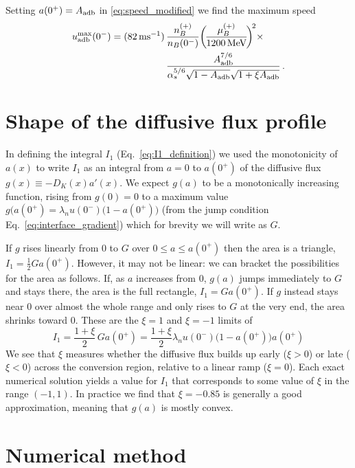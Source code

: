 \documentclass[10pt,superscriptaddress,
amsmath,aps,prc,twocolumn,nofootinbib,floatfix]{revtex4-1}
\newcommand{\mga}[1]{{\color[rgb]{0.6,0,0}#1}}
\newcommand{\al}{\alpha}
\newcommand{\m}{\text{m}}
\newcommand{\s}{\text{s}}
\newcommand{\MeV}{\text{MeV}}
\newcommand{\Bratio}{\lambda_n}
\newcommand{\azp}{\ensuremath{a(0^+)}}
\begin{document}
Setting $\azp=A_{\rm adb}$ in \eqref{eq:speed_modified} we find the maximum speed
\begin{align}
u^{\max}_{\rm adb} (0^-) = (82\,\m\s^{-1})\,
&\dfrac{n_B^{(+)}}{n_B(0^-)}
\biggl(\!\dfrac{\mu_B^{(+)}}{1200\,\MeV}\!\biggr)^{\!2}
\times \notag\\
& \dfrac{ A_{\rm adb}^{7/6}}{\al_s^{5/6} \sqrt{1-A_{\rm adb}}\sqrt{1+\xi A_{\rm adb}}} \, .\label{eq:adiabatic_approx_appendix}
\end{align}




\section{Shape of the diffusive flux profile}
\label{sec:xi-shape}

\mga{
In defining the integral $I_1$ (Eq.~\eqref{eq:I1_definition}) we used the monotonicity of $a(x)$  to write $I_1$ as an integral from $a=0$ to $a(0^+)$ of the diffusive flux $g(x)\equiv-D_K(x)a'(x)$. We expect $g(a)$ to be a monotonically increasing function, rising from $g(0)=0$ to a maximum value $g(a(0^+)=\Bratio u(0^-)\bigl(1-a(0^+)\bigr)$ (from the jump condition Eq.~\eqref{eq:interface_gradient}) which for brevity we will write as $G$.

If $g$ rises linearly from $0$ to $G$ over $0\leq a\leq a(0^+)$ then the area is a triangle, $I_1=\frac12 Ga(0^+)$.
However, it may not be linear: we can bracket the possibilities for the area as follows.
If, as $a$ increases from 0, $g(a)$ jumps immediately to $G$ and stays there, the area is the full rectangle, $I_1=Ga(0^+)$.
If $g$ instead stays near $0$ over almost the whole range and only rises to $G$ at the very end, the area shrinks toward $0$.
These are the $\xi=1$ and $\xi=-1$ limits of
\begin{equation}
I_1=\frac{1+\xi}{2}\,Ga(0^+)
= \frac{1+\xi}{2} \Bratio u(0^-)\bigl(1-a(0^+)\bigr)a(0^+)
\label{eq:xi-def}
\end{equation}
We see that $\xi$ measures whether the diffusive flux builds up early ($\xi>0$) or late ($\xi<0$) across the conversion region, relative to a linear ramp ($\xi=0$).
Each exact numerical solution yields a value for $I_1$ that corresponds to some value of $\xi$ in the range $(-1,1)$. In practice we find that  $\xi = -0.85$ is generally a good approximation, meaning that $g(a)$ is mostly convex.
}

\section{Numerical method}
\label{sec:numerical}
\end{document}
